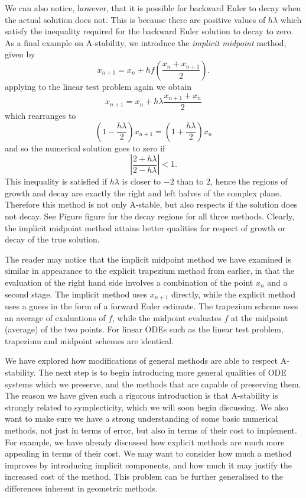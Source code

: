 We can also notice, however, that it is possible for backward Euler to decay when the actual solution does not.
This is because there are positive values of $h \lambda$ which satisfy the inequality required for the backward Euler solution to decay to zero.
As a final example on A-stability, we introduce the \textit{implicit midpoint} method, given by
\begin{equation}
    x_{n+1} = x_n + h f \left(
        \frac{x_n + x_{n+1}}{2}
    \right).
\end{equation} 
applying to the linear test problem again we obtain
\begin{equation*}
    x_{n+1} = x_n + h \lambda \frac{x_{n+1} + x_n}{2}
\end{equation*}
which rearranges to
\begin{equation*}
    \left( 1 - \frac{h \lambda}{2} \right) x_{n+1} = \left( 1 + \frac{h \lambda}{2} \right) x_n
\end{equation*}
and so the numerical solution goes to zero if
\begin{equation*}
    \left| \frac{2 + h \lambda}{2 - h \lambda} \right| < 1.
\end{equation*}
This inequality is satisfied if $h \lambda$ is closer to $-2$ than to $2$, hence the regions of growth and decay are exactly the right and left halves of the complex plane.
Therefore this method is not only A-stable, but also respects if the solution does not decay.
See Figure {figure} for the decay regions for all three methods.
Clearly, the implicit midpoint method attains better qualities for respect of growth or decay of the true solution.

The reader may notice that the implicit midpoint method we have examined is similar in appearance to the explicit trapezium method from earlier,
in that the evaluation of the right hand side involves a combination of the point $x_n$ and a second stage.
The implicit method uses $x_{n+1}$ directly, while the explicit method uses a guess in the form of a forward Euler estimate.
The trapezium scheme uses an average of exaluations of $f$, while the midpoint evaluates $f$ at the midpoint (average) of the two points.
For linear ODEs such as the linear test problem, trapezium and midpoint schemes are identical.

We have explored how modifications of general methods are able to respect A-stability.
The next step is to begin introducing more general qualities of ODE systems which we preserve, and the methods that are capable of preserving them.
The reason we have given such a rigorous introduction is that A-stability is strongly related to symplecticity, which we will soon begin discussing.
We also want to make sure we have a strong understanding of some basic numerical methods, not just in terms of error, but also in terms of their cost to implement.
For example, we have already discussed how explicit methods are much more appealing in terms of their cost.
We may want to consider how much a method improves by introducing implicit components, and how much it may justify the increased cost of the method.
This problem can be further generalised to the differences inherent in geometric methods.

